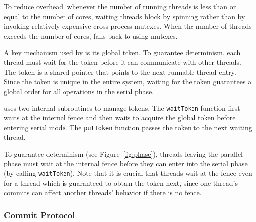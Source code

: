 To reduce overhead, whenever the number of running threads is less than or equal
to the number of cores, waiting threads block by spinning rather
than by invoking relatively expensive cross-process \pthreads{}
mutexes. When the number of threads exceeds the number of
cores, \dthreads{} falls back to using \pthreads{} mutexes.


A key mechanism used by \dthreads{} is its global token.
To guarantee determinism, each thread must wait for the token
before it can communicate with other threads. 
The token is a shared pointer that points to the next runnable thread entry.
Since the token is unique in the entire system, waiting for the token guarantees a global order for
all operations in the serial phase. 

\dthreads{} uses two internal subroutines to manage tokens. The \texttt{waitToken} function
first waits at the internal fence and then waits to acquire the global token
before entering serial mode. The \texttt{putToken} function passes the token to
the next waiting thread.

To guarantee determinism (see Figure~\ref{fig:phase}), threads leaving the parallel phase 
must wait at the internal fence before they can enter into the serial phase (by calling
\texttt{waitToken}).
Note that it is crucial that threads wait at the fence even for a thread which is guaranteed to obtain the token next,
since one thread's commits can affect another threads' behavior if there is no fence.





\subsubsection{Commit Protocol}
\label{sec:protocol}

